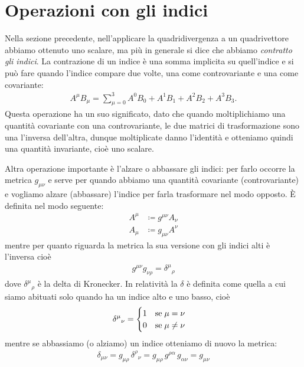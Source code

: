 \section{Operazioni con gli indici}
Nella sezione precedente, nell'applicare la quadridivergenza a un quadrivettore abbiamo ottenuto uno scalare, ma più in generale si dice che abbiamo 
\textit{contratto gli indici}. La contrazione di un indice è una somma implicita su quell'indice e si può fare quando l'indice compare due volte, una 
come controvariante e una come covariante:
\begin{align}
  A^\mu B_\mu = \sum_{\mu = 0}^3 A^0B_0 + A^1B_1 + A^2B_2 + A^3B_3.
\end{align}
Questa operazione ha un suo significato, dato che quando moltiplichiamo una quantità covariante con una controvariante, le due matrici di trasformazione 
sono una l'inversa dell'altra, dunque moltiplicate danno l'identità e otteniamo quindi una quantità invariante, cioè uno scalare.

Altra operazione importante è l'alzare o abbassare gli indici: per farlo occorre la metrica $ g_{\mu \nu} $ e serve per quando abbiamo una quantità 
covariante (controvariante) e vogliamo alzare (abbassare) l'indice per farla trasformare nel modo opposto. È definita nel modo seguente:
\begin{align}
  A^\mu &\coloneq g^{\mu \nu} A_\nu
  \\
  A_\mu &\coloneq g_{\mu \nu} A^\nu
\end{align}
mentre per quanto riguarda la metrica la sua versione con gli indici alti è l'inversa cioè
\begin{align}
  g^{\mu \nu} g_{\nu \rho} = \delta^\mu{}_\rho
\end{align}
dove $ {\delta^\mu}_\rho $ è la delta di Kronecker. In relatività la $ \delta $ è definita come quella a cui siamo abituati solo quando ha un indice alto 
e uno basso, cioè
\begin{align}
  \delta^\mu{}_\nu = 
  \begin{cases}
    \displaystyle 1 \quad \textnormal{se} \; \mu = \nu \\
    \displaystyle 0 \quad \textnormal{se} \; \mu \neq \nu \\
  \end{cases}
\end{align}
mentre se abbassiamo (o alziamo) un indice otteniamo di nuovo la metrica:
\begin{align}
  \delta_{\mu \nu} = g_{\mu \rho}\, \delta^\rho{}_\nu = g_{\mu \rho} \, g^{\rho \alpha} \, g_{\alpha \nu} = g_{\mu \nu}
\end{align}

